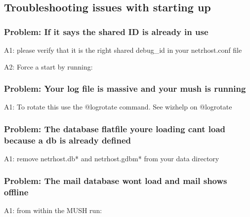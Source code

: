 \documentclass[letterpaper,10pt,english]{sphinxmanual}
\begin{document}
\subsection{Troubleshooting issues with starting up}
\label{\detokenize{troubleshooting:troubleshooting-issues-with-starting-up}}

\subsubsection{Problem: If it says the shared ID is already in use}
\label{\detokenize{troubleshooting:problem-if-it-says-the-shared-id-is-already-in-use}}
\sphinxAtStartPar
A1: please verify that it is the right shared debug\_id in your netrhost.conf file

\sphinxAtStartPar
A2: Force a start by running:

\begin{sphinxVerbatim}[commandchars=\\\{\}]
 
\end{sphinxVerbatim}


\subsubsection{Problem: Your log file is massive and your mush is running}
\label{\detokenize{troubleshooting:problem-your-log-file-is-massive-and-your-mush-is-running}}
\sphinxAtStartPar
A1: To rotate this use the @logrotate command. See wizhelp on @logrotate


\subsubsection{Problem: The database flatfile you\textquotesingle{}re loading can\textquotesingle{}t load because a db is already defined}
\label{\detokenize{troubleshooting:problem-the-database-flatfile-you-re-loading-can-t-load-because-a-db-is-already-defined}}
\sphinxAtStartPar
A1: remove netrhost.db* and netrhost.gdbm* from your data directory


\subsubsection{Problem: The mail database won\textquotesingle{}t load and mail shows \textquotesingle{}offline\textquotesingle{}}
\label{\detokenize{troubleshooting:problem-the-mail-database-won-t-load-and-mail-shows-offline}}
\sphinxAtStartPar
A1: from within the MUSH run:
\end{document}
